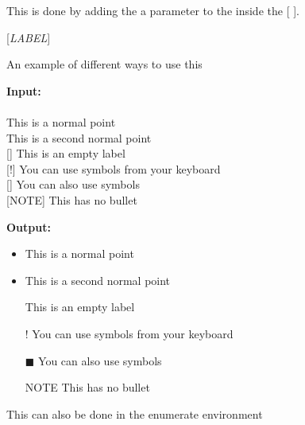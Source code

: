 This is done by adding the a parameter to the  inside the [ ].

\begin{center}
    [\textit{LABEL}]
\end{center}

An example of different ways to use this \\

\begin{multicols}{2}
    \begin{minipage}{\linewidth}
        \textbf{Input:} \\
         \\
         This is a normal point \\
         This is a second normal point \\
        [] This is an empty label \\
        [!] You can use symbols from your keyboard \\
        [] You can also use symbols \\
        [NOTE] This has no bullet
    \end{minipage}

    \begin{minipage}{\linewidth}
        \textbf{Output:} \\
        \begin{itemize}
            \item This is a normal point 
            \item This is a second normal point 
            \item [] This is an empty label 
            \item [!] You can use symbols from your keyboard
            \item [$\blacksquare$] You can also use symbols
            \item [NOTE] This has no bullet
        \end{itemize}
    \end{minipage}
\end{multicols}

This can also be done in the enumerate environment

